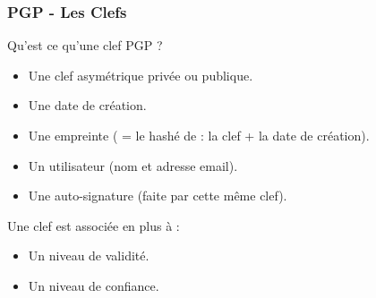 \begin{frame}
    \frametitle{\color{white}PGP - Les Clefs}
    \begin{block}{Qu'est ce qu'une clef PGP ?}
    	\begin{itemize}
	  \item Une clef asymétrique privée ou publique.
	  \item Une date de création.
	  \item Une empreinte ( = le hashé de : la clef + la date de création).
	  \item Un utilisateur (nom et adresse email).
	  \item Une auto-signature (faite par cette même clef).
       \end{itemize} 
    \end{block}
    \begin{block}{Une clef est associée en plus à :}
      \begin{itemize}
        \item Un niveau de validité.
	\item Un niveau de confiance.
      \end{itemize}
    \end{block}

\end{frame}

